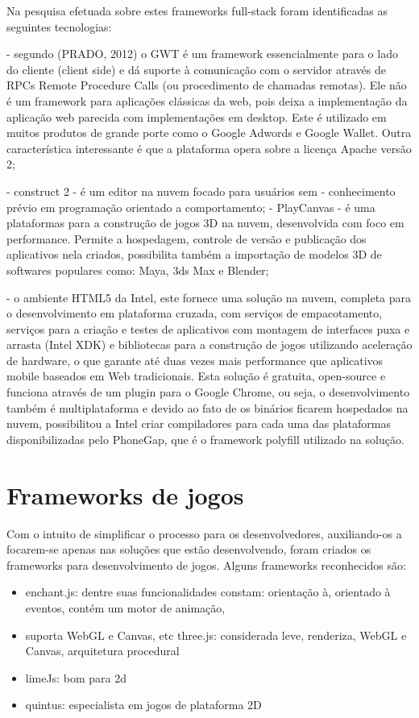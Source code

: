 \documentclass[
12pt,
a4paper,
portuges,
draft
]{report}
\begin{document}
Na pesquisa efetuada sobre estes frameworks full-stack foram
identificadas as seguintes tecnologias:

    - segundo (PRADO, 2012) o GWT é um framework essencialmente para
o lado do cliente (client side) e dá suporte à comunicação com
o servidor através de RPCs Remote Procedure Calls (ou procedimento
de chamadas remotas). Ele não é um framework para aplicações
clássicas da web, pois deixa a implementação da aplicação web
parecida com implementações em desktop. Este é utilizado em muitos
produtos de grande porte como o Google Adwords e Google Wallet. Outra
característica interessante é que a plataforma opera sobre a licença
Apache versão 2;

    - construct 2 - é um editor na nuvem focado para usuários sem
    - conhecimento prévio em programação orientado a comportamento;
    - PlayCanvas - é uma plataformas para a construção de jogos 3D
na nuvem, desenvolvida com foco em performance. Permite a hospedagem,
controle de versão e publicação dos aplicativos nela criados,
possibilita também a importação de modelos 3D de softwares populares
como: Maya, 3ds Max e Blender;

    - o ambiente HTML5 da Intel, este fornece uma solução na nuvem,
completa para o desenvolvimento em plataforma cruzada, com serviços de
empacotamento, serviços para a criação e testes de aplicativos com
montagem de interfaces puxa e arrasta (Intel XDK) e bibliotecas para a
construção de jogos utilizando aceleração de hardware, o que garante
até duas vezes mais performance que aplicativos mobile baseados em
Web tradicionais. Esta solução é gratuita, open-source e funciona
através de um plugin para o Google Chrome, ou seja, o desenvolvimento
também é multiplataforma e devido ao fato de os binários ficarem
hospedados na nuvem, possibilitou a Intel criar compiladores para cada
uma das plataformas disponibilizadas pelo PhoneGap, que é o framework
polyfill utilizado na solução.

\section{Frameworks de jogos}

Com o intuito de simplificar o processo para os desenvolvedores,
auxiliando-os a focarem-se apenas nas soluções que estão
desenvolvendo, foram criados os frameworks para desenvolvimento de
jogos. Alguns frameworks reconhecidos são:

\begin{itemize}
\item enchant.js: dentre suas funcionalidades constam: orientação à, orientado à eventos, contém um motor de animação,
\item suporta WebGL e Canvas, etc three.js: considerada leve, renderiza, WebGL e Canvas, arquitetura procedural
\item limeJs: bom para 2d
\item quintus: especialista em jogos de plataforma 2D
\end{itemize}
\end{document}
